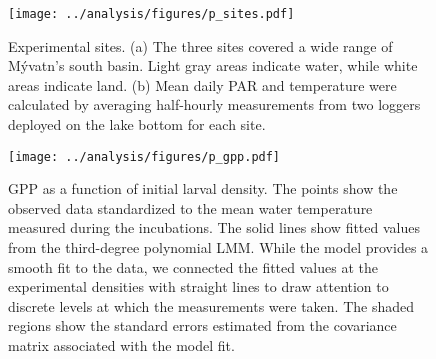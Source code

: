 \documentclass[12pt]{article}
\begin{document}
% 
% 
% 




\begin{figure}
\centering
\texttt{[image: ../analysis/figures/p\_sites.pdf]}
\caption{\label{fig:sites}
Experimental sites. 
(a) The three sites covered a wide range of M\'{y}vatn's south basin.
Light gray areas indicate water, while white areas indicate land.
(b) Mean daily PAR and temperature were calculated by averaging half-hourly
measurements from two loggers deployed on the lake bottom for each site.
}
\end{figure}

\clearpage




\begin{figure}
\centering
\texttt{[image: ../analysis/figures/p\_gpp.pdf]}
\caption{\label{fig:gpp}
GPP as a function of initial larval density.
The points show the observed data standardized to the mean water temperature
measured during the incubations.
The solid lines show fitted values from the third-degree polynomial LMM.
While the model provides a smooth fit to the data,
we connected the fitted values at the experimental densities with
straight lines to draw attention to discrete levels at which the measurements were taken. 
The shaded regions show the standard errors estimated from the 
covariance matrix associated with the model fit.
}
\end{figure}
\end{document}
